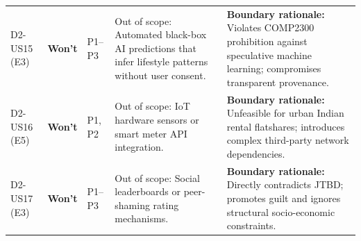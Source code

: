 \documentclass[12pt,a4paper]{article}
\begin{document}
\begin{table}[ht]
\begin{tabularx}{\textwidth}{@{}p{1.2cm}p{1.2cm}p{1.5cm}Xp{5.0cm}@{}}
\midrule
D2-US15 (E3) & \textbf{Won't} & P1--P3 & Out of scope: Automated black-box AI predictions that infer lifestyle patterns without user consent. & \textbf{Boundary rationale:} Violates COMP2300 prohibition against speculative machine learning; compromises transparent provenance.\\
D2-US16 (E5) & \textbf{Won't} & P1, P2 & Out of scope: IoT hardware sensors or smart meter API integration. & \textbf{Boundary rationale:} Unfeasible for urban Indian rental flatshares; introduces complex third-party network dependencies.\\
D2-US17 (E3) & \textbf{Won't} & P1--P3 & Out of scope: Social leaderboards or peer-shaming rating mechanisms. & \textbf{Boundary rationale:} Directly contradicts JTBD; promotes guilt and ignores structural socio-economic constraints.\\
\bottomrule
\end{tabularx}
\end{table}
\end{document}
